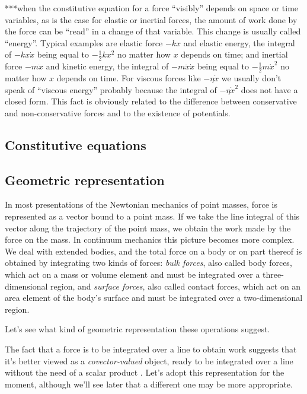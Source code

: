 \documentclass[\ifafour a4paper,12pt,\else a5paper,10pt,\fi%
onecolumn,oneside,article,%
british%
]{memoir}
\theoremstyle{remark}
\theoremstyle{innote}
\renewcommand*{\cites}{\parencites}
\renewcommand*{\|}{\nonscript\,\vert\nonscript\;\mathopen{}}
\newcommand*{\sect}{\S}%
\newcommand*{\chap}{ch.}%
\newcommand*{\chaps}{chs}%
\begin{document}
***when the constitutive equation for a force \enquote{visibly} depends on
space or time variables, as is the case for elastic or inertial forces, the
amount of work done by the force can be \enquote{read} in a change of that
variable. This change is usually called \enquote{energy}. Typical examples
are elastic force $-kx$ and elastic energy, the integral of $-kx\Dot{x}$
being equal to $-\frac{1}{2}kx^2$ no matter how $x$ depends on time; and
inertial force $-m\ddot{x}$ and kinetic energy, the integral of
$-m\ddot{x}\Dot{x}$ being equal to $-\frac{1}{2}m\Dot{x}^2$ no matter how
$x$ depends on time. For viscous forces like $-\eta\Dot{x}$ we usually
don't speak of \enquote{viscous energy} probably because the integral of
$-\eta\Dot{x}^2$ does not have a closed form. This fact is obviously
related to the difference between conservative and non-conservative forces
and to the existence of potentials.

\subsection{Constitutive equations}
\label{sec:constit_eq}



\subsection{Geometric representation}
\label{sec:geometry_force}

In most presentations of the Newtonian mechanics of point masses, force is
represented as a vector bound to a point mass. If we take the line integral
of this vector along the trajectory of the point mass, we obtain the work
made by the force on the mass. In continuum mechanics this picture becomes
more complex. We deal with extended bodies, and the total force on a body
or on part thereof is obtained by integrating two kinds of forces:
\emph{bulk forces}, also called body forces, which act on a mass or volume
element and must be integrated over a three-dimensional region, and
\emph{surface forces}, also called contact forces, which act on an area
element of the body's surface and must be integrated over a two-dimensional
region.

Let's see what kind of geometric representation these operations suggest.

The fact that a force is to be integrated over a line to obtain work
suggests that it's better viewed as a \emph{covector-valued} object, ready
to be integrated over a line without the need of a scalar product
\cites[\sect~12]{burke1995}[\sect~VII.2]{schouten1951}[\sect~2]{vandantzig1954}[\chaps~VI--VII]{burke1985_r1987}[\chap~7]{bambergetal1988_r1990}.
Let's adopt this representation for the moment, although we'll see later
that a different one may be more appropriate.
\end{document}
